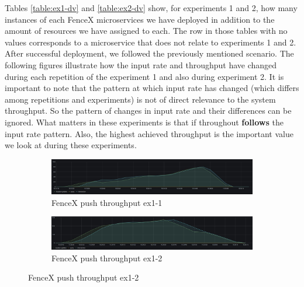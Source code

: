 \documentclass[a4]{report}
\begin{document}
    Tables \ref{table:ex1-dv} and \ref{table:ex2-dv} show, for experiments 1 and 2, how many instances of each FenceX
    microservices we have deployed in addition to the amount of resources we have assigned to each.
    The row in those tables with no values corresponds to a microservice that does not relate to experiments 1 and 2.
    After successful deployment, we followed the previously mentioned scenario.
    The following figures illustrate how the input rate and throughput have changed during each repetition of the experiment
    1 and also during experiment 2.
    It is important to note that the pattern at which input rate has changed (which differs among repetitions and
    experiments) is not of direct relevance to the system throughput.
    So the pattern of changes in input rate and their differences can be ignored.
    What matters in these experiments is that if throughout \textbf{follows} the input rate pattern.
    Also, the highest achieved throughput is the important value we look at during these experiments.

    \begin{figure}
        \centering
        \begin{subfigure}[b]{\textwidth}
            \centering
            \caption{FenceX push throughput ex1-1}
            \label{fig:ex1-1}
            \includegraphics[width=\textwidth, height=0.35\textheight, scale=2]{images/evaluation/ex1-benchmarking(15,6).png}
        \end{subfigure}

        \begin{subfigure}[b]{\textwidth}
            \centering
            \caption{FenceX push throughput ex1-2}
            \label{fig:ex1-2}
            \includegraphics[width=\textwidth, height=0.35\textheight, scale=2]{images/evaluation/ex1-benchmarking(19,7).png}
        \end{subfigure}
    \end{figure}
\end{document}
